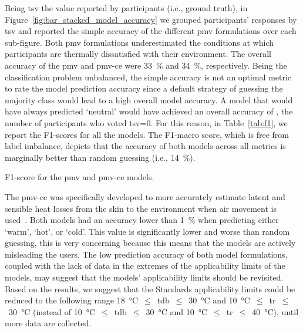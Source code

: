 Being \ac{tsv} the value reported by participants (i.e., ground truth), in Figure~\ref{fig:bar_stacked_model_accuracy} we grouped participants' responses by \ac{tsv} and reported the simple accuracy of the different \ac{pmv} formulations over each sub-figure.
Both \ac{pmv} formulations underestimated the conditions at which participants are thermally dissatisfied with their environment.
The overall accuracy of the \ac{pmv} and \ac{pmv-ce} were \qty{33}{\percent} and \qty{34}{\percent}, respectively.
Being the classification problem unbalanced, the simple accuracy is not an optimal metric to rate the model prediction accuracy since a default strategy of guessing the majority class would lead to a high overall model accuracy.
A model that would have always predicted `neutral' would have achieved an overall accuracy of , the number of participants who voted \ac{tsv}=0.
For this reason, in Table~\ref{tab:f1}, we report the F1-scores for all the models.
The F1-macro score, which is free from label imbalance, depicts that the accuracy of both models across all metrics is marginally better than random guessing (i.e., \qty{14}{\percent}).
\begin{table}[htb!]
    \centering
    
    \caption{F1-score for the \ac{pmv} and \ac{pmv-ce} models.}
    \label{tab:f1}
\end{table}

The \ac{pmv-ce} was specifically developed to more accurately estimate latent and sensible heat losses from the skin to the environment when air movement is used~\cite{arens_moving_2009}.
Both models had an accuracy lower than \qty{1}{\percent} when predicting either `warm', `hot', or `cold'.
This value is significantly lower and worse than random guessing, this is very concerning because this means that the models are actively misleading the users.
The low prediction accuracy of both model formulations, coupled with the lack of data in the extremes of the applicability limits of the models, may suggest that the models' applicability limits should be revisited.
Based on the results, we suggest that the Standards applicability limits could be reduced to the following range \qty{18}{\celsius}~$\leq$~\ac{tdb}~$\leq$~\qty{30}{\celsius} and \qty{10}{\celsius}~$\leq$~\ac{tr}~$\leq$~\qty{30}{\celsius} (instead of \qty{10}{\celsius}~$\leq$~\ac{tdb}~$\leq$~\qty{30}{\celsius} and \qty{10}{\celsius}~$\leq$~\ac{tr}~$\leq$~\qty{40}{\celsius}),  until more data are collected. 

